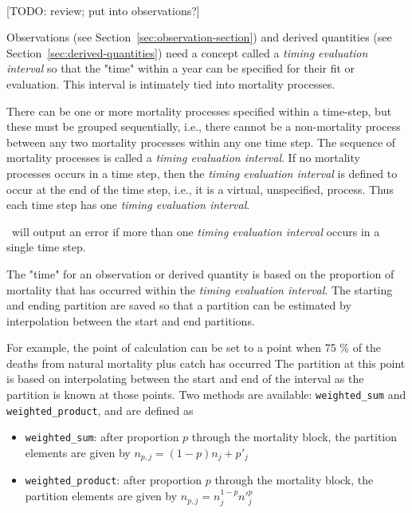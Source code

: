 \paragraph{}\label{sec:mortality_block}\label{Timing evaluation interval}

[TODO: review; put into observations?]

Observations (see Section~\ref{sec:observation-section})  and derived quantities (see Section~\ref{sec:derived-quantities}) need a concept called a \textit{timing evaluation interval} so that the "time" within a year can be specified for their fit or evaluation. This interval is intimately tied into mortality processes.

There can be one or more mortality processes specified within a time-step, but these must  be grouped sequentially, i.e., there cannot be a non-mortality process between any two mortality processes within any one time step. The sequence of mortality processes is called a \textit{timing evaluation interval}.  If no mortality processes occurs in a time step, then the \textit{timing evaluation interval} is defined to occur at the end of the time step, i.e., it is a virtual, unspecified,  process. Thus  each time step has one \textit{timing evaluation interval}. 

\CNAME~will output an error if more than one \textit{timing evaluation interval} occurs in a single time step. 

The "time" for an observation or derived quantity is based on the proportion of mortality that has occurred within the \textit{timing evaluation interval}. The starting and ending partition are saved so that a partition can be estimated by  interpolation between the start and end partitions.

For example, the point of calculation can be set to a point  when 75 \% of the deaths from natural mortality plus catch has occurred The partition at this point is based on interpolating between the start and end of the interval as the partition is known at those points.  Two  methods are available: \texttt{weighted\_sum} and \texttt{weighted\_product}, and are defined as

\begin{itemize}
	\item \texttt{weighted\_sum}: after proportion $p$ through the mortality block, the partition elements are given by $n_{p,j} = (1 - p)n_j + p'_j$

	\item \texttt{weighted\_product}: after proportion $p$ through the mortality block, the partition elements are given by $n_{p,j} = n_j^{1-p} n'^p_j$
\end{itemize}

